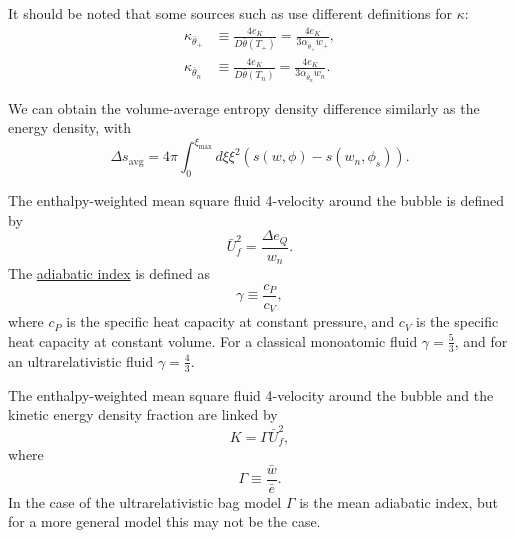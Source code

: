 It should be noted that some sources such as \cites[eq. 36]{giese_2020}[eq. 12, 14]{giese_2021}
use different definitions for $\kappa$:
\begin{align}
\kappa_{\bar{\theta}_+} &\equiv \frac{4 e_K}{D \bar{\theta}(T_+)} = \frac{4 e_K}{3 \alpha_{\bar{\theta}_+} w_+},
\label{eq:kappa_thetabar_plus} \\
\kappa_{\bar{\theta}_n} &\equiv \frac{4 e_K}{D \bar{\theta}(T_n)} = \frac{4 e_K}{3 \alpha_{\bar{\theta}_n} w_n}.
\label{eq:kappa_thetabar_n}
\end{align}

We can obtain the volume-average entropy density difference similarly as the energy density, with
\begin{equation}
\Delta s_\text{avg} = 4\pi \int_0^{\xi_\text{max}} d\xi \xi^2 \left( s(w,\phi) - s(w_n, \phi_s) \right).
\end{equation}

\iffalse
Relative volume-averaged entropy density
\begin{equation}
TODO = \frac{s_\text{avg}}{s_n}
\end{equation}
\fi

The enthalpy-weighted mean square fluid 4-velocity around the bubble is defined by
\begin{equation}
\bar{U}_f^2 = \frac{\Delta e_Q}{w_n}.
\end{equation}
The \href{https://en.wikipedia.org/wiki/Heat_capacity_ratio}{adiabatic index} is defined as
\begin{equation}
\gamma \equiv \frac{c_P}{c_V},
\end{equation}
where $c_P$ is the specific heat capacity at constant pressure,
and $c_V$ is the specific heat capacity at constant volume.
For a classical monoatomic fluid $\gamma = \frac{5}{3}$,
and for an ultrarelativistic fluid $\gamma = \frac{4}{3}$.

The enthalpy-weighted mean square fluid 4-velocity around the bubble and the kinetic energy density fraction are linked by
\begin{equation}
K = \Gamma \bar{U}_f^2,
\end{equation}
where
\begin{equation}
\Gamma \equiv \frac{\bar{w}}{\bar{e}}.
\end{equation}
In the case of the ultrarelativistic bag model $\Gamma$ is the mean adiabatic index,
but for a more general model this may not be the case.


